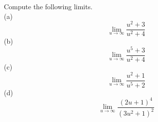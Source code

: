 Compute the following limits.\\
(a)
\begin{equation*}
  \lim_{u\rightarrow \infty} \frac{u^2+3}{u^2+4}
\end{equation*}
(b)
\begin{equation*}
  \lim_{u\rightarrow \infty} \frac{u^5+3}{u^2+4}
\end{equation*}
(c)
\begin{equation*}
  \lim_{u\rightarrow \infty} \frac{u^2+1}{u^5+2}
\end{equation*}
(d)
\begin{equation*}
  \lim_{u\rightarrow \infty} \frac{(2u+1)^4}{(3u^2+1)^2}
\end{equation*}
